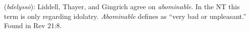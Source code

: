 \item[Abominable,]

(\textit{bdelyssō}):
Liddell, Thayer, and Gingrich agree on \textit{abominable}. In the NT this term is only regarding idolatry. 
\textit{Abominable} defines as ``very bad or unpleasant.''
Found in Rev 21:8.

